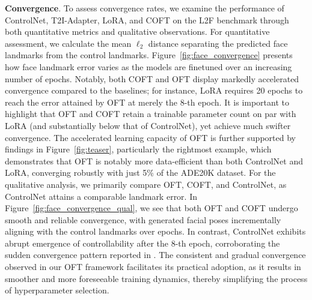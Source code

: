 \textbf{Convergence}. To assess convergence rates, we examine the performance of ControlNet, T2I-Adapter, LoRA, and COFT on the L2F benchmark through both quantitative metrics and qualitative observations. For quantitative assessment, we calculate the mean $\ell_2$ distance separating the predicted face landmarks from the control landmarks. Figure~\ref{fig:face_convergence} presents how face landmark error varies as the models are finetuned over an increasing number of epochs. Notably, both COFT and OFT display markedly accelerated convergence compared to the baselines; for instance, LoRA requires 20 epochs to reach the error attained by OFT at merely the 8-th epoch. It is important to highlight that OFT and COFT retain a trainable parameter count on par with LoRA (and substantially below that of ControlNet), yet achieve much swifter convergence. The accelerated learning capacity of OFT is further supported by findings in Figure~\ref{fig:teaser}, particularly the rightmost example, which demonstrates that OFT is notably more data-efficient than both ControlNet and LoRA, converging robustly with just 5\% of the ADE20K dataset. For the qualitative analysis, we primarily compare OFT, COFT, and ControlNet, as ControlNet attains a comparable landmark error. In Figure~\ref{fig:face_convergence_qual}, we see that both OFT and COFT undergo smooth and reliable convergence, with generated facial poses incrementally aligning with the control landmarks over epochs. In contrast, ControlNet exhibits abrupt emergence of controllability after the 8-th epoch, corroborating the sudden convergence pattern reported in \cite{zhang2023adding}. The consistent and gradual convergence observed in our OFT framework facilitates its practical adoption, as it results in smoother and more foreseeable training dynamics, thereby simplifying the process of hyperparameter selection.

